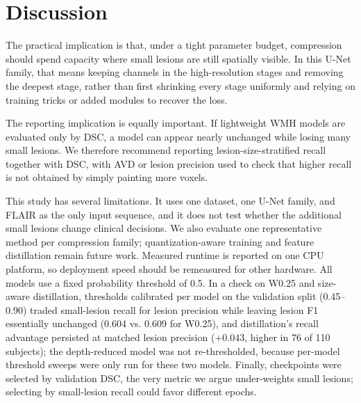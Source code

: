 \documentclass[conference]{IEEEtran}
\begin{document}
\section{Discussion}

The practical implication is that, under a tight parameter budget,
compression should spend capacity where small lesions are still spatially
visible. In this U-Net family, that means keeping channels in the
high-resolution stages and removing the deepest stage, rather than first
shrinking every stage uniformly and relying on training tricks or added
modules to recover the loss.

The reporting implication is equally important. If lightweight WMH
models are evaluated only by DSC, a model can appear nearly unchanged
while losing many small lesions. We therefore recommend reporting
lesion-size-stratified recall together with DSC, with AVD or lesion
precision used to check that higher recall is not obtained by simply
painting more voxels.

This study has several limitations. It uses one dataset, one U-Net family,
and FLAIR as the only input sequence, and it does not test whether the
additional small lesions change clinical decisions. We also evaluate one
representative method per compression family; quantization-aware training
and feature distillation remain future work. Measured runtime is reported
on one CPU platform, so deployment speed should be remeasured for other
hardware. All models use a fixed probability threshold of 0.5. In a check
on W0.25 and size-aware distillation, thresholds calibrated per model on
the validation split (0.45--0.90) traded small-lesion recall for lesion
precision while leaving lesion F1 essentially unchanged (0.604 vs. 0.609
for W0.25), and distillation's recall advantage persisted at matched
lesion precision ($+0.043$, higher in 76 of 110 subjects); the
depth-reduced model was not re-thresholded, because per-model threshold
sweeps were only run for these two models. Finally,
checkpoints were selected by validation DSC, the very metric we argue
under-weights small lesions; selecting by small-lesion recall could favor
different epochs.
\end{document}
